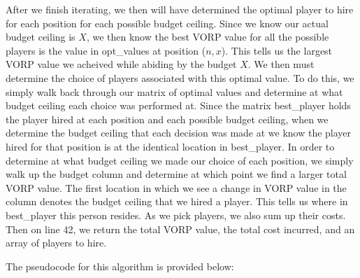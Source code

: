 \documentclass[11pt]{article}
\begin{document}
After we finish iterating, we then will have determined the optimal player to hire for each position for each possible budget ceiling. Since we know our actual budget ceiling is $X$, we then know the best VORP value for all the possible players is the value in opt\_values at position ($n,x$). This tells us the largest VORP value we acheived while abiding by the budget $X$. We then must determine the choice of players associated with this optimal value. To do this, we simply walk back through our matrix of optimal values and determine at what budget ceiling each choice was performed at. Since the matrix best\_player holds the player hired at each position and each possible budget ceiling, when we determine the budget ceiling that each decision was made at we know the player hired for that position is at the identical location in best\_player. In order to determine at what budget ceiling we made our choice of each position, we simply walk up the budget column and determine at which point we find a larger total VORP value. The first location in which we see a change in VORP value in the column denotes the budget ceiling that we hired a player. This tells us where in best\_player this person resides. As we pick players, we also sum up their costs. Then on line 42, we return the total VORP value, the total cost incurred, and an array of players to hire.

The pseudocode for this algorithm is provided below:
\end{document}
